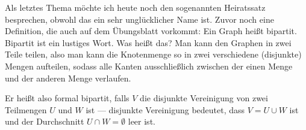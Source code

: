 \begin{spoken-clean}[00:56:52 - 00:58:30]
Als letztes Thema möchte ich heute noch den sogenannten Heiratssatz besprechen, obwohl das ein sehr unglücklicher Name ist. Zuvor noch eine Definition, die auch auf dem Übungsblatt vorkommt: Ein Graph heißt bipartit. Bipartit ist ein lustiges Wort. Was heißt das? Man kann den Graphen in zwei Teile teilen, also man kann die Knotenmenge so in zwei verschiedene (disjunkte) Mengen aufteilen, sodass alle Kanten ausschließlich zwischen der einen Menge und der anderen Menge verlaufen.

Er heißt also formal bipartit, falls $V$ die disjunkte Vereinigung von zwei Teilmengen $U$ und $W$ ist --- disjunkte Vereinigung bedeutet, dass $V = U \cup W$ ist und der Durchschnitt $U \cap W = \emptyset$ leer ist.
\end{spoken-clean}

